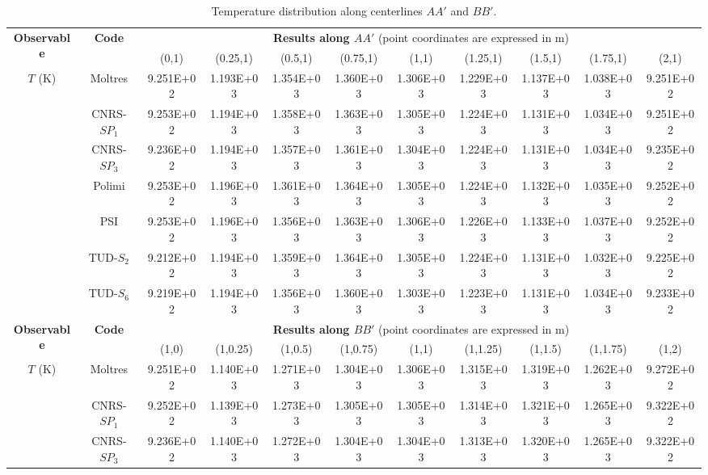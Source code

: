 \documentclass[letterpaper,11pt]{article}
\begin{document}
\begin{table}[htbp!]
	\caption{Temperature distribution along centerlines $AA'$ and $BB'$.}
	\centering
	\footnotesize
	\setlength\tabcolsep{1.5pt}
	\begin{tabular}{c c c c c c c c c c c}
		\toprule
		\multirow{2}{*}{\textbf{Observable}} & \multirow{2}{*}{\textbf{Code}} & \multicolumn{9}{c}{\textbf{Results along $AA'$} (point coordinates are expressed in m)} \\
		& & {(0,1)} & {(0.25,1)} & {(0.5,1)} & {(0.75,1)} & {(1,1)} & {(1.25,1)} & {(1.5,1)} & {(1.75,1)} & {(2,1)} \\
		\midrule
		\multirow{7}{*}{$T$ (K)} & Moltres & 9.251E+02 & 1.193E+03 & 1.354E+03 & 1.360E+03 &
		1.306E+03 & 1.229E+03 & 1.137E+03 & 1.038E+03 & 9.251E+02 \\
		& CNRS-$SP_1$ & 9.253E+02 & 1.194E+03 & 1.358E+03 & 1.363E+03 & 1.305E+03 & 1.224E+03 & 1.131E+03 & 1.034E+03 & 9.251E+02 \\
		& CNRS-$SP_3$ & 9.236E+02 & 1.194E+03 & 1.357E+03 & 1.361E+03 & 1.304E+03 & 1.224E+03 & 1.131E+03 & 1.034E+03 & 9.235E+02 \\
		& Polimi & 9.253E+02 & 1.196E+03 & 1.361E+03 & 1.364E+03 & 1.305E+03 & 1.224E+03 & 1.132E+03 & 1.035E+03 & 9.252E+02 \\
		& PSI & 9.253E+02 & 1.196E+03 & 1.356E+03 & 1.363E+03 & 1.306E+03 & 1.226E+03 & 1.133E+03 & 1.037E+03 & 9.252E+02 \\
		& TUD-$S_2$ & 9.212E+02 & 1.194E+03 & 1.359E+03 & 1.364E+03 & 1.305E+03 & 1.224E+03 & 1.131E+03 & 1.032E+03 & 9.225E+02 \\
		& TUD-$S_6$ & 9.219E+02 & 1.194E+03 & 1.356E+03 & 1.360E+03 & 1.303E+03 & 1.223E+03 & 1.131E+03 & 1.034E+03 & 9.233E+02 \\
		\midrule
		\midrule
		\multirow{2}{*}{\textbf{Observable}} & \multirow{2}{*}{\textbf{Code}} & \multicolumn{9}{c}{\textbf{Results along $BB'$} (point coordinates are expressed in m)} \\
		& & {(1,0)} & {(1,0.25)} & {(1,0.5)} & {(1,0.75)} & {(1,1)} & {(1,1.25)} & {(1,1.5)} & {(1,1.75)} & {(1,2)} \\
		\midrule
		\multirow{7}{*}{$T$ (K)} & Moltres & 9.251E+02 & 1.140E+03 & 1.271E+03 & 1.304E+03 &
		1.306E+03 & 1.315E+03 & 1.319E+03 & 1.262E+03 & 9.272E+02 \\
		& CNRS-$SP_1$ & 9.252E+02 & 1.139E+03 & 1.273E+03 & 1.305E+03 & 1.305E+03 & 1.314E+03 & 1.321E+03 & 1.265E+03 & 9.322E+02 \\
		& CNRS-$SP_3$ & 9.236E+02 & 1.140E+03 & 1.272E+03 & 1.304E+03 & 1.304E+03 & 1.313E+03 & 1.320E+03 & 1.265E+03 & 9.322E+02 \\

\end{tabular}
\end{table}
\end{document}
